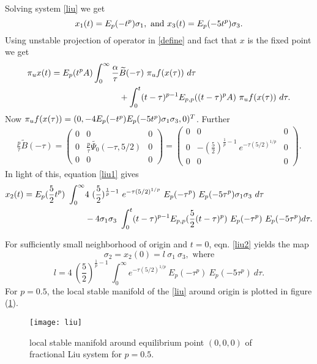 \begin{exmp}
	Solving system \eqref{liu} we get
	\begin{equation}
	x_1(t) = E_{p}(- t^{p}) \sigma_1, ~\text{and}~ x_3(t) = E_{p}(-5 t^{p}) \sigma_3. 
	\end{equation}
	Using unstable projection of operator in \eqref{define} and fact that $x$ is the fixed point we get
	\begin{align}
	\begin{split} \label{liu1}
	\pi_u x(t) = E_{p}(t^{p} A) \int_{0}^{\infty} \frac{\alpha}{\tau} &\widetilde{B}(-\tau)~ \pi_u f(x(\tau)) ~d\tau \\&+ \int_{0}^{t} (t-\tau)^{p -1} E_{p,p}((t-\tau)^{p} A)~\pi_u f(x(\tau)) ~d\tau.
	\end{split}
	\end{align}
	 Now $\pi_u f(x(\tau))  = (0, -4 E_{p}(- t^{p}) E_{p}(-5 t^{p}) \sigma_1 \sigma_3,0)^T$.
	 Further
	 \begin{align}
	 \frac{p}{\tau} \widetilde{B}(-\tau) = \begin{pmatrix}
	 0 & 0 & 0 \\ 0 & \frac{p}{\tau} \widetilde{\Psi_0}(-\tau,5/2) & 0 \\ 0 & 0 & 0
	 \end{pmatrix} = \begin{pmatrix}
	 0 & 0 & 0 \\ 0 & - (\frac{5}{2})^{\frac{1}{p}-1} ~e^{-\tau (5/2)^{1/p}}& 0 \\ 0 & 0 & 0
	 \end{pmatrix}.
	 \end{align}
	 In light of this, equation \eqref{liu1} gives
	 \begin{align}
	 \begin{split}\label{liu2}
	 x_2(t) = E_{p}(\frac{5}{2} t^{p}) ~\int_{0}^{\infty} &4~ (\frac{5}{2})^{\frac{1}{p}-1}~e^{-\tau (5/2)^{1/p}} ~E_p(-\tau^p)~E_p(-5 \tau^p) \sigma_1 \sigma_3~ d\tau \\
	 &-4 \sigma_1 \sigma_3~ \int_{0}^{t}  (t-\tau)^{p -1} E_{p,p}(\frac{5}{2}(t-\tau)^{p})~E_p(-\tau^p)~E_p(-5 \tau^p) d\tau.
	 \end{split}
	 \end{align}
	 	 
	 For sufficiently small neighborhood of origin and $t=0$, eqn. \eqref{liu2} yields the map
	 \begin{equation}\label{liu3}
	 \sigma_2 = x_2(0) = l ~\sigma_1 ~\sigma_3, \text{ where}
	 \end{equation}
	  \begin{equation}
	 l = 4~ (\frac{5}{2})^{\frac{1}{p}-1} ~\int_{0}^{\infty} e^{-\tau (5/2)^{1/p}} ~E_p(-\tau^p)~E_p(-5 \tau^p) ~ d\tau.
	 \end{equation}
	 For $p=0.5$, the local stable manifold of the \eqref{liu} around origin is plotted in figure (\ref{figliu}).
	\begin{figure}[H]
		\centering
		\texttt{[image: liu]}
		\caption{ local stable manifold around equilibrium point $(0,0,0)$ of fractional Liu system for $p=0.5$.}
			\label{figliu}
	\end{figure}
\end{exmp} 

